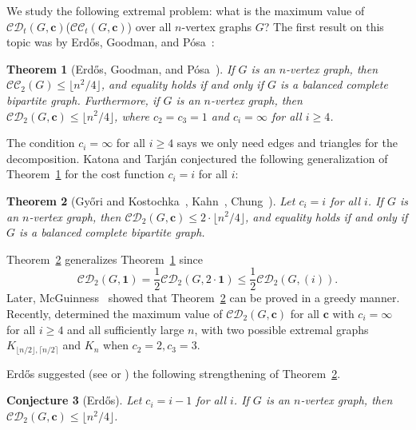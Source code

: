 \documentclass[11pt]{article}
\numberwithin{equation}{section}
\newtheorem{theorem}{Theorem}[section]
\newtheorem{conjecture}[theorem]{Conjecture}
\theoremstyle{remark}
\newcommand{\CC}{\mathcal{CC}}
\newcommand{\CD}{\mathcal{CD}}
\begin{document}
We study the following extremal problem: what is the maximum value of \(\CD_t(G,\mathbf c)\)(\(\CC_t(G,\mathbf c)\))
over all \(n\)-vertex graphs \(G\)? The first result on this topic was by Erd{\H o}s, Goodman, and P{\'o}sa~\cite{EGP}:

\begin{theorem}[Erd{\H o}s, Goodman, and P{\'o}sa~\cite{EGP}]\label{thm:EGP}
  If \(G\) is an \(n\)-vertex graph, then \(\CC_2(G) \le \lfloor n^2/4\rfloor\), and equality holds
  if and only if \(G\) is a balanced complete bipartite graph. Furthermore, if \(G\) is an \(n\)-vertex graph,
  then \(\CD_2(G,\mathbf{c}) \le \lfloor n^2/4\rfloor\), where \(c_2 = c_3 = 1\) and \(c_i = \infty\) for all \(i \ge 4\).
\end{theorem}

The condition \(c_i = \infty\) for all \(i \ge 4\) says we only need edges and triangles for the decomposition.
Katona and Tarj\'an conjectured the following generalization of Theorem~\ref{thm:EGP} for the cost function \(c_i=i\) for all \(i\):

\begin{theorem}[Gy\H{o}ri and Kostochka~\cite{GyoriKostochka}, Kahn~\cite{Kahnthm}, Chung~\cite{Chung}]\label{thm:GyKKC}
  Let \(c_i = i\) for all \(i\). If \(G\) is an \(n\)-vertex graph, then \(\CD_2(G, \mathbf{c}) \le 2 \cdot \lfloor n^2/4\rfloor\),
  and equality holds if and only if \(G\) is a balanced complete bipartite graph.
\end{theorem}

Theorem~\ref{thm:GyKKC} generalizes Theorem~\ref{thm:EGP} since
\begin{equation*}\CD_2(G,\mathbf 1)=\frac12\CD_2(G,2\cdot \mathbf 1)\le \frac12\CD_2(G,(i)).\end{equation*}
Later, McGuinness~\cite{McGuinness} showed that Theorem~\ref{thm:GyKKC} can be proved in a greedy manner.
Recently, \cite{BLPPPV,KLMP} determined the maximum value of \(\CD_2(G,\mathbf{c})\) for all \(\mathbf{c}\) with \(c_i = \infty\) for all \(i \geq 4\) and all sufficiently large \(n\),
with two possible extremal graphs \(K_{\lfloor n/2\rfloor,\lceil n/2\rceil}\) and \(K_n\) when \(c_2=2, c_3=3\).

Erd\H{o}s suggested (see \cite[Problem 43]{Tuza} or \cite{Gyori}) the following strengthening of Theorem~\ref{thm:GyKKC}.
\begin{conjecture}[Erd\H{o}s]\label{conjerdos}
Let \(c_i = i-1\) for all \(i\). If \(G\) is an \(n\)-vertex graph, then \(\CD_2(G,\mathbf{c}) \le \lfloor n^2/4\rfloor\).
\end{conjecture}
\end{document}
